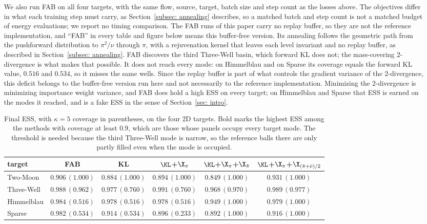 \documentclass{article}
\begin{document}
We also run FAB \citep{midgley2022flow} on all four targets, with the same flow, source, target, batch size and step count as the losses above. The objectives differ in what each training step must carry, as Section~\ref{subsec: annealing} describes, so a matched batch and step count is not a matched budget of energy evaluations; we report no timing comparison. The FAB runs of this paper carry no replay buffer, so they are not the reference implementation, and ``FAB'' in every table and figure below means this buffer-free version. Its annealing follows the geometric path from the pushforward distribution to $\pi^2/\nu$ through $\pi$, with a rejuvenation kernel that leaves each level invariant and no replay buffer, as described in Section~\ref{subsec: annealing}. FAB discovers the third Three-Well basin, which forward KL does not; the mass-covering $2$-divergence is what makes that possible. It does not reach every mode: on Himmelblau and on Sparse its coverage equals the forward KL value, $0.516$ and $0.534$, so it misses the same wells. Since the replay buffer is part of what controls the gradient variance of the $2$-divergence, this deficit belongs to the buffer-free version run here and not necessarily to the reference implementation. Minimizing the $2$-divergence is minimizing importance weight variance, and FAB does hold a high ESS on every target; on Himmelblau and Sparse that ESS is earned on the modes it reached, and is a fake ESS in the sense of Section~\ref{sec: intro}. 

\begin{table}[htb]
    \centering
    \begin{tabular}{lccccc}
        \toprule
        target & FAB & KL & $\KL$+$\X_\pi$ & $\KL$+$\X_\pi$+$\X_{\hat\pi}$ & $\KL$+$\X_\pi$+$\X_{(\hat\pi+\bar\nu)/2}$ \\
        \midrule
        Two-Moon   & $0.906\,(1.000)$ & $0.884\,(1.000)$ & $0.894\,(1.000)$ & $0.849\,(1.000)$ & $\mathbf{0.931}\,(1.000)$ \\
        Three-Well & $0.988\,(0.962)$ & $0.977\,(0.760)$ & $0.991\,(0.760)$ & $0.968\,(0.970)$ & $\mathbf{0.989}\,(0.977)$ \\
        Himmelblau & $0.984\,(0.516)$ & $0.978\,(0.516)$ & $0.978\,(0.516)$ & $0.949\,(1.000)$ & $\mathbf{0.979}\,(1.000)$ \\
        Sparse     & $0.982\,(0.534)$ & $0.914\,(0.534)$ & $0.896\,(0.233)$ & $0.892\,(1.000)$ & $\mathbf{0.916}\,(1.000)$ \\
        \bottomrule
    \end{tabular}
    \caption{Final ESS, with $\kappa=5$ coverage in parentheses, on the four 2D targets. Bold marks the highest ESS among the methods with coverage at least $0.9$, which are those whose panels occupy every target mode. The threshold is needed because the third Three-Well mode is narrow, so the reference balls there are only partly filled even when the mode is occupied.}
    \label{tab: 2d-benchmark-summary}
\end{table}
\end{document}
